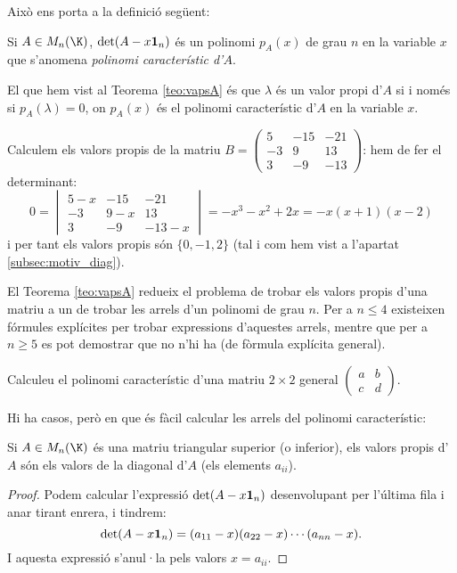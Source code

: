 Això ens porta a la definició següent:
\begin{definicio}
Si $A\in M_n(\K)$, $\det(A-x \mathbf{1}_n)$ és un polinomi $p_A(x)$ de grau $n$ en la variable $x$ que s'anomena \emph{polinomi característic d'$A$}.
\end{definicio}

El que hem vist al Teorema \ref{teo:vapsA} és que $\lambda$ és un valor propi d'$A$ si i només si $p_A(\lambda)=0$, on $p_A(x)$ és el polinomi característic d'$A$ en la variable $x$.

\begin{exemple}
Calculem els valors propis de la matriu $B=\left(\begin{smallmatrix}
5 & -15 & -21 \\ -3 & 9 & 13 \\ 3 & -9 & -13
\end{smallmatrix}\right)$: hem de fer el determinant:
$$
0=
\begin{vmatrix}
5-x & -15 & -21 \\ -3 & 9-x & 13 \\ 3 & -9 & -13-x
\end{vmatrix} = -x^3 -x^2+2x=-x(x+1)(x-2)
$$
i per tant els valors propis són $\{0,-1,2\}$ (tal i com hem vist a l'apartat \ref{subsec:motiv_diag}).
\end{exemple}
\begin{observacio}
El Teorema \ref{teo:vapsA} redueix el problema de trobar els valors propis d'una matriu a un de trobar les arrels d'un polinomi de grau $n$. Per a $n\leq 4$ existeixen fórmules explícites per trobar expressions d'aquestes arrels, mentre que per a $n\geq 5$ es pot demostrar que no n'hi ha (de fòrmula explícita general).
\end{observacio}

\begin{exercici}
Calculeu el polinomi característic d'una matriu $2\times 2$ general $\left(\begin{smallmatrix}a&b\\c&d\end{smallmatrix} \right)$.
\end{exercici}

Hi ha casos, però en que és fàcil calcular les arrels del polinomi característic:
\begin{lema}\label{lema:vap_triangsup}
Si $A\in M_n(\K)$ és una matriu triangular superior (o inferior), els valors propis d'$A$ són els valors de la diagonal d'$A$ (els elements $a_{ii}$).
\end{lema}
\begin{proof}
Podem calcular l'expressió $\det(A-x\mathbf{1}_n)$ desenvolupant per l'última fila i anar tirant enrera, i tindrem:
$$
\det(A-x \mathbf{1}_n)=(a_{11}-x)(a_{22}-x)\cdots (a_{nn}-x).
$$
I aquesta expressió s'anul·la pels valors $x=a_{ii}$.
\end{proof}

